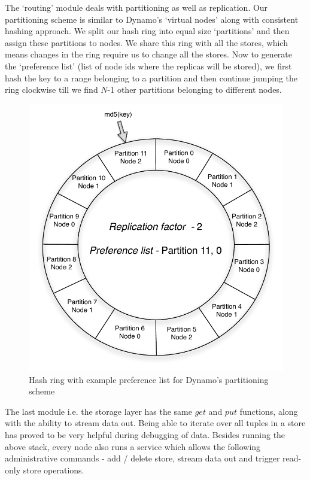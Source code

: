 The `routing' module deals with partitioning as well as replication. Our partitioning scheme is similar to Dynamo's `virtual nodes' along with consistent hashing approach. We split our hash ring into equal size `partitions' and then assign these partitions to nodes. We share this ring with all the stores, which means changes in the ring require us to change all the stores. Now to generate the `preference list' (list of node ids where the replicas will be stored), we first hash the key to a range belonging to a partition and then continue jumping the ring clockwise till we find $N$-1 other partitions belonging to different nodes. 

\begin{figure}
  \centering
    \includegraphics[scale=0.40]{images/hash.pdf}
  \caption{Hash ring with example preference list for Dynamo's partitioning scheme }
  \label{hash}
\end{figure}

The last module i.e. the storage layer has the same $get$ and $put$ functions, along with the ability to stream data out. Being able to iterate over all tuples in a store has proved to be very helpful during debugging of data. Besides running the above stack, every node also runs a service which allows the following administrative commands - add / delete store, stream data out and trigger read-only store operations. 

